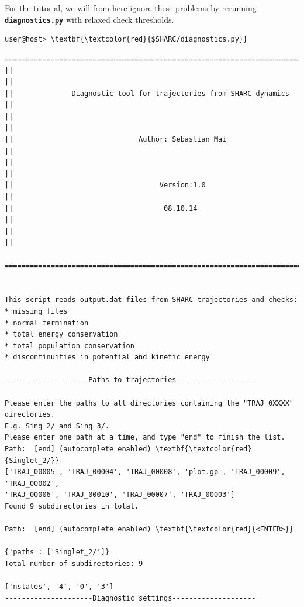 \documentclass[a4paper,11pt,DIV=15,openany]{scrbook}
\newcommand{\ttt}[1]{\textbf{\texttt{#1}}}
\begin{document}
For the tutorial, we will from here ignore these problems by rerunning \ttt{diagnostics.py} with relaxed check thresholds.

\begin{Verbatim}[commandchars=\\\{\}]
user@host> \textbf{\textcolor{red}{$SHARC/diagnostics.py}}
\end{Verbatim}


\begin{oframed}
\footnotesize\begin{Verbatim}[commandchars=\\\{\}]
  ================================================================================
||                                                                                ||
||              Diagnostic tool for trajectories from SHARC dynamics              ||
||                                                                                ||
||                              Author: Sebastian Mai                             ||
||                                                                                ||
||                                   Version:1.0                                  ||
||                                    08.10.14                                    ||
||                                                                                ||
  ================================================================================


This script reads output.dat files from SHARC trajectories and checks:
* missing files
* normal termination
* total energy conservation
* total population conservation
* discontinuities in potential and kinetic energy
  
--------------------Paths to trajectories-------------------

Please enter the paths to all directories containing the "TRAJ_0XXXX" directories.
E.g. Sing_2/ and Sing_3/. 
Please enter one path at a time, and type "end" to finish the list.
Path:  [end] (autocomplete enabled) \textbf{\textcolor{red}{Singlet_2/}}
['TRAJ_00005', 'TRAJ_00004', 'TRAJ_00008', 'plot.gp', 'TRAJ_00009', 'TRAJ_00002', 
'TRAJ_00006', 'TRAJ_00010', 'TRAJ_00007', 'TRAJ_00003']
Found 9 subdirectories in total.

Path:  [end] (autocomplete enabled) \textbf{\textcolor{red}{<ENTER>}}

{'paths': ['Singlet_2/']}
Total number of subdirectories: 9

['nstates', '4', '0', '3']
---------------------Diagnostic settings--------------------


\end{Verbatim}
\end{oframed}
\end{document}
